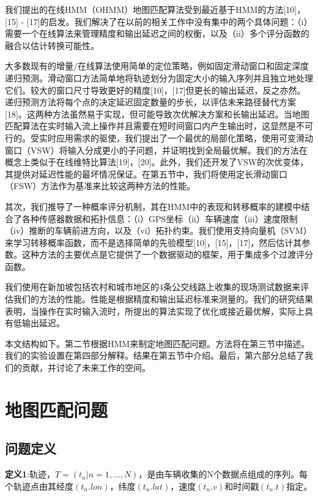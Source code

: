 我们提出的在线HMM（OHMM）地图匹配算法受到最近基于HMM的方法[10]，[15] - [17]的启发。我们解决了在以前的相关工作中没有集中的两个具体问题：（i）需要一个在线算法来管理精度和输出延迟之间的权衡，以及（ii）多个评分函数的融合以估计转换可能性。

大多数现有的增量/在线算法使用简单的定位策略，例如固定滑动窗口和固定深度递归预测。滑动窗口方法简单地将轨迹划分为固定大小的输入序列并且独立地处理它们。较大的窗口尺寸导致更好的精度[10]，[17]但更长的输出延迟，反之亦然。递归预测方法将每个点的决定延迟固定数量的步长，以评估未来路径替代方案[18]。这两种方法虽然易于实现，但可能导致次优解决方案和长输出延迟。当地图匹配算法在实时输入流上操作并且需要在短时间窗口内产生输出时，这显然是不可行的。受实时应用需求的驱使，我们提出了一个最优的局部化策略，使用可变滑动窗口（VSW）将输入分成更小的子问题，并证明找到全局最优解。我们的方法在概念上类似于在线维特比算法[19]，[20]。此外，我们还开发了VSW的次优变体，其提供对延迟性能的最坏情况保证。在第五节中，我们将使用定长滑动窗口（FSW）方法作为基准来比较这两种方法的性能。

其次，我们推导了一种概率评分机制，其在HMM中的表现和转移概率的建模中结合了各种传感器数据和拓扑信息：（i）GPS坐标（ii）车辆速度（iii）速度限制（iv）推断的车辆前进方向，以及（vi）拓扑约束。我们使用支持向量机（SVM）来学习转移概率函数，而不是选择简单的先验模型[10]，[15]，[17]，然后估计其参数。这种方法的主要优点是它提供了一个数据驱动的框架，用于集成多个过渡评分函数。

我们使用在新加坡包括农村和城市地区的4条公交线路上收集的现场测试数据来评估我们的方法的性能。性能是根据精度和输出延迟标准来测量的。我们的研究结果表明，当操作在实时输入流时，所提出的算法实现了优化或接近最优解，实际上具有低输出延迟。

本文结构如下。第二节根据HMM来制定地图匹配问题。方法将在第三节中描述。我们的实验设置在第四部分解释。结果在第五节中介绍。最后，第六部分总结了我们的贡献，并讨论了未来工作的空间。


\section{地图匹配问题}

\subsection{问题定义}

\textbf{定义1}:轨迹，$T=(t_{n} | n=1,...,N)$，是由车辆收集的N个数据点组成的序列。每个轨迹点由其经度$(t_{n}.lon)$，纬度$(t_{n}.lat)$，速度$(t_{n}.v)$和时间戳$(t_{n}.t)$指定。

